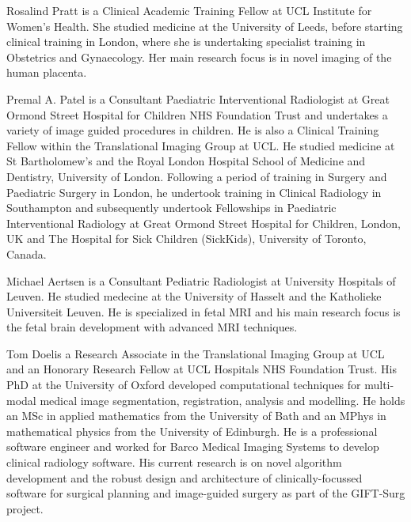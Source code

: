 \documentclass[10pt,journal,compsoc]{IEEEtran}
\begin{document}
\begin{IEEEbiography}{Rosalind Pratt} is a Clinical Academic Training Fellow at UCL Institute for Women's Health. She studied medicine at the University of Leeds, before starting clinical training in London, where she is undertaking specialist training in Obstetrics and Gynaecology. Her main research focus is in novel imaging of the human placenta.
\end{IEEEbiography}


\begin{IEEEbiography}{Premal A. Patel} is a Consultant Paediatric Interventional Radiologist at Great Ormond Street Hospital for Children NHS Foundation Trust and undertakes a variety of image guided procedures in children.  He is also a Clinical Training Fellow within the Translational Imaging Group at UCL. He studied medicine at St Bartholomew’s and the Royal London Hospital School of Medicine and Dentistry, University of London. Following a period of training in Surgery and Paediatric Surgery in London, he undertook training in Clinical Radiology in Southampton and subsequently undertook Fellowships in Paediatric Interventional Radiology at Great Ormond Street Hospital for Children, London, UK and The Hospital for Sick Children (SickKids), University of Toronto, Canada. 
\end{IEEEbiography}


\begin{IEEEbiography}{Michael Aertsen} is a Consultant Pediatric Radiologist at University Hospitals of Leuven. He studied medecine at the University of Hasselt and the Katholieke Universiteit Leuven. He is specialized in fetal MRI and his main research focus is the fetal brain development with advanced MRI techniques.
\end{IEEEbiography}


\begin{IEEEbiography}{Tom Doel}is a Research Associate in the Translational Imaging Group at UCL and an Honorary Research Fellow at UCL Hospitals NHS Foundation Trust. His PhD at the University of Oxford developed computational techniques for multi-modal medical image segmentation, registration, analysis and modelling. He holds an MSc in applied mathematics from the University of Bath and an MPhys in mathematical physics from the University of Edinburgh. He is a professional software engineer and worked for Barco Medical Imaging Systems to develop clinical radiology software. His current research is on novel algorithm development and the robust design and architecture of clinically-focussed software for surgical planning and image-guided surgery as part of the GIFT-Surg project.
\end{IEEEbiography}
\end{document}
